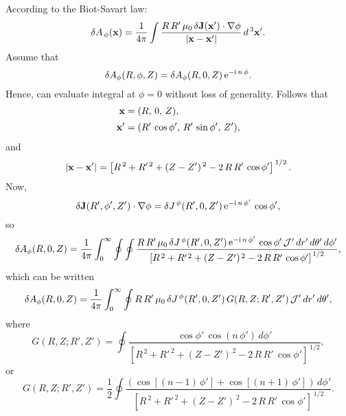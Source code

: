 \documentclass[12pt]{article}
\begin{document}
According to the Biot-Savart law:
\begin{equation}
\delta A_{\,\phi}({\bf x}) = \frac{1}{4\pi}\int \frac{R\,R'\,\mu_0\,\delta {\bf J}({\bf x'})\cdot\nabla\phi}{|{\bf x}-{\bf x}'|}\,d^{\,3}{\bf x}'.
\end{equation}
Assume that
\begin{equation}
\delta A_\phi (R,\phi,Z) = \delta A_\phi(R,0,Z)\,{\rm e}^{-{\rm i}\,n\,\phi}.
\end{equation}
Hence, can evaluate integral at $\phi=0$ without loss of generality. 
Follows that
\begin{align}
{\bf x} &= (R,\,0,\,Z),\\[0.5ex]
{\bf x'}&= (R'\,\cos\phi',\,R'\,\sin\phi',\,Z'),
\end{align}
and
\begin{equation}
|{\bf x}-{\bf x}'| = \left[R^{\,2}+R'^{\,2} +(Z-Z')^{\,2} -2\,R\,R'\,\cos\phi'\right]^{\,1/2}.
\end{equation}
Now,
\begin{equation}
\delta {\bf J}(R',\phi',Z')\cdot\nabla\phi= \delta J^{\,\phi}(R',0,Z')\,{\rm e}^{-{\rm i}\,n\,\phi'}\,\cos\phi',
\end{equation}
so
\begin{equation}
\delta A_\phi(R,0,Z)= \frac{1}{4\pi}\int_0^\infty
\oint\oint \frac{R\,R'\,\mu_0\,\delta J^{\,\phi}(R',0,Z')\,{\rm e}^{-{\rm i}\,n\,\phi'}\,\cos\phi'\,{\cal J}'\,dr'\,d\theta'\,d\phi'}{\left[R^{\,2}+R'^{\,2} +(Z-Z')^{\,2} -2\,R\,R'\,\cos\phi'\right]^{\,1/2}},
\end{equation}
which can be written
\begin{equation}
\delta A_\phi(R,0,Z)= \frac{1}{4\pi}\int_0^\infty
\oint R\,R'\,\mu_0\,\delta J^{\,\phi}(R',0,Z')\,G(R,Z;R',Z')\,{\cal J}'\,dr'\,d\theta',
\end{equation}
where
\begin{equation}
G(R,Z;R',Z') = \oint \frac{\cos \phi'\,\cos(n\,\phi')\,d\phi'}{\left[R^{\,2}+R'^{\,2} +(Z-Z')^{\,2} -2\,R\,R'\,\cos\phi'\right]^{\,1/2}},
\end{equation}
or
\begin{equation}
G(R,Z;R',Z') = \frac{1}{2}\oint \frac{\left(\cos[(n-1)\,\phi']+\cos[(n+1)\,\phi']\right)\,d\phi'}{\left[R^{\,2}+R'^{\,2} +(Z-Z')^{\,2} -2\,R\,R'\,\cos\phi'\right]^{\,1/2}}.
\end{equation}
\end{document}
